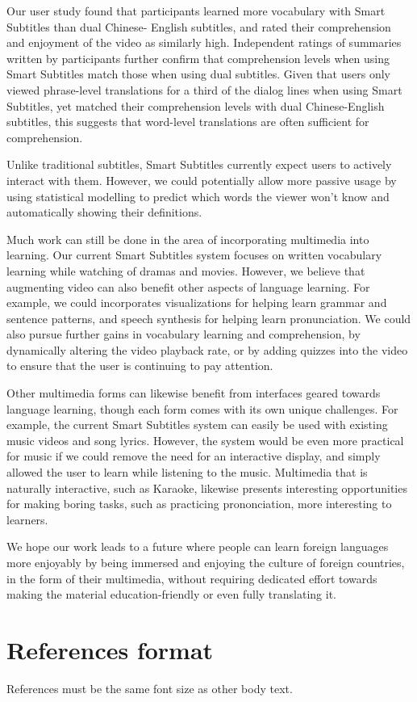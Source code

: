 \documentclass{sigchi}
\begin{document}
Our user study found that participants learned more
vocabulary with Smart Subtitles than dual Chinese-
English subtitles, and rated their comprehension and
enjoyment of the video as similarly high.
Independent ratings of summaries written by participants
further confirm that comprehension levels when using Smart Subtitles
match those when using dual subtitles.
Given that users only viewed phrase-level translations for a
third of the dialog lines when using Smart Subtitles,
yet matched their comprehension levels with dual Chinese-English subtitles,
this suggests that word-level translations are often sufficient for
comprehension.

Unlike traditional subtitles, Smart Subtitles currently expect users to actively interact with them. However, we could potentially allow more
passive usage by using statistical modelling to predict which words the viewer
won’t know and automatically showing their definitions.

Much work can still be done in the area of incorporating multimedia into learning. Our current Smart Subtitles system focuses on written vocabulary learning while watching of dramas and movies.
However, we believe that augmenting video can also benefit other aspects of language learning. For example, we could
incorporates visualizations for helping learn grammar and sentence patterns,
and speech synthesis for helping learn pronunciation. We could also 
pursue further gains in vocabulary learning and comprehension,
by dynamically altering the video playback rate, or by adding
quizzes into the video to ensure that the user is continuing to pay attention.

Other multimedia forms can likewise benefit from interfaces geared
towards language learning, though each form comes with its own
unique challenges. For example, the current Smart Subtitles system can
easily be used with existing music videos and song lyrics.
However, the system would be even more practical for music if
we could remove the need for an interactive display, and simply
allowed the user to learn while listening to the music.
Multimedia that is naturally interactive, such as Karaoke,
likewise presents interesting opportunities for
making boring tasks, such as practicing prononciation, more interesting
to learners.

We hope our work leads to a future where people can learn foreign languages more enjoyably by being immersed and enjoying the culture of foreign countries, in the form of their multimedia, without requiring dedicated effort towards making the material education-friendly or even fully translating it.

\balance

\section{References format}
References must be the same font size as other body text.



\end{document}
